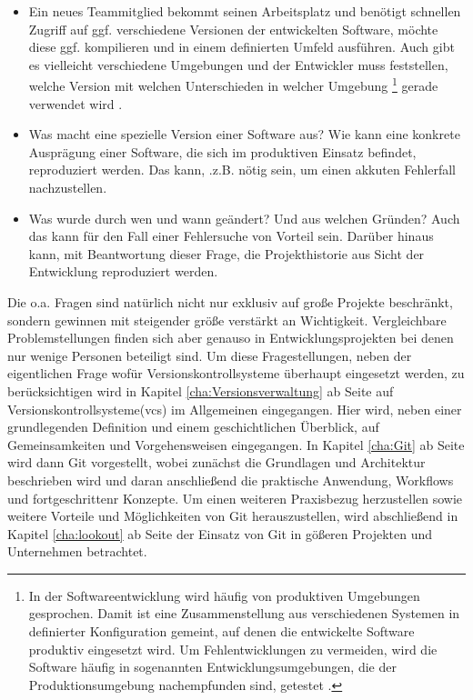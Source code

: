 \begin{itemize}
  \item Ein neues Teammitglied bekommt seinen Arbeitsplatz und ben\"otigt
  schnellen Zugriff auf ggf. verschiedene Versionen der entwickelten Software,
  m\"ochte diese ggf. kompilieren und in einem definierten Umfeld ausf\"uhren.
  Auch gibt es vielleicht verschiedene Umgebungen und der Entwickler muss
  feststellen, welche Version mit welchen Unterschieden in welcher \gls{Umgebung}
  \footnote{\label{umgebung:1}In der Softwareentwicklung wird häufig von
  produktiven Umgebungen gesprochen. Damit ist eine Zusammenstellung aus
  verschiedenen Systemen in definierter Konfiguration gemeint, auf denen die
  entwickelte Software produktiv eingesetzt wird. Um Fehlentwicklungen zu
  vermeiden, wird die Software häufig in sogenannten Entwicklungsumgebungen,
  die der Produktionsumgebung nachempfunden sind, getestet \cite[S.~49,
  250]{cd}.} gerade verwendet wird \citep[S.~26]{cd}.
  \item Was macht eine spezielle Version einer Software aus?  Wie kann eine
  konkrete Auspr\"agung einer Software, die sich im produktiven Einsatz
  befindet, reproduziert werden. Das kann, .z.B. n\"otig sein, um einen akkuten
  Fehlerfall nachzustellen\cite[s.~33]{cd}.
  \item Was wurde durch wen und wann ge\"andert? Und aus welchen Gr\"unden?
  Auch das kann f\"ur den Fall einer Fehlersuche von Vorteil sein. Darüber
  hinaus kann, mit Beantwortung dieser Frage, die Projekthistorie aus Sicht der
  Entwicklung reproduziert werden\cite[S.~33]{cd}.
\end{itemize}
Die o.a. Fragen sind natürlich nicht nur exklusiv auf große Projekte
beschränkt, sondern gewinnen mit steigender größe verstärkt an Wichtigkeit.
Vergleichbare Problemstellungen finden sich aber genauso in
Entwicklungsprojekten bei denen nur wenige Personen beteiligt sind. Um diese
Fragestellungen, neben der eigentlichen Frage wofür Versionskontrollsysteme
überhaupt eingesetzt werden, zu berücksichtigen wird in Kapitel
\ref{cha:Versionsverwaltung} ab Seite \pageref{cha:Versionsverwaltung} auf
Versionskontrollsysteme(\acrshort{vcs}) im Allgemeinen eingegangen. Hier wird,
neben einer grundlegenden Definition und einem geschichtlichen Überblick, auf
Gemeinsamkeiten und Vorgehensweisen eingegangen. In Kapitel \ref{cha:Git} ab
Seite \pageref{cha:Git} wird dann Git vorgestellt, wobei zunächst die
Grundlagen und Architektur beschrieben wird und daran anschließend die
praktische Anwendung, Workflows und fortgeschrittenr Konzepte. Um einen
weiteren Praxisbezug herzustellen sowie weitere Vorteile und Möglichkeiten von
Git herauszustellen, wird abschließend in Kapitel \ref{cha:lookout} ab Seite
\pageref{cha:lookout} der Einsatz von Git in gößeren Projekten und Unternehmen
betrachtet.
